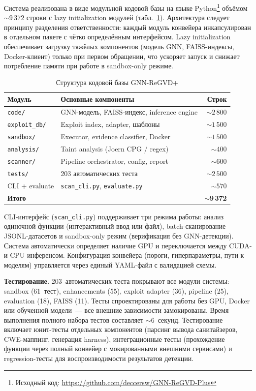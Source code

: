 \documentclass[runningheads]{llncs}
\begin{document}
Система реализована в виде модульной кодовой базы на языке Python\footnote{Исходный код: \url{https://github.com/deccersw/GNN-ReGVD-Plus}} объёмом ${\sim}9\,372$ строки с lazy initialization модулей (табл.~\ref{tab:codebase}). Архитектура следует принципу разделения ответственности: каждый модуль конвейера инкапсулирован в отдельном пакете с чётко определённым интерфейсом. Lazy initialization обеспечивает загрузку тяжёлых компонентов (модель GNN, FAISS-индексы, Docker-клиент) только при первом обращении, что ускоряет запуск и снижает потребление памяти при работе в sandbox-only режиме.

\begin{table}
\centering
\caption{Структура кодовой базы GNN-ReGVD+}
\label{tab:codebase}
\small
\begin{tabular}{|l|l|r|}
\hline
\textbf{Модуль} & \textbf{Основные компоненты} & \textbf{Строк} \\
\hline
\texttt{code/} & GNN-модель, FAISS-индекс, inference engine & ${\sim}2\,800$ \\
\texttt{exploit\_db/} & Exploit index, adapter, шаблоны & ${\sim}1\,500$ \\
\texttt{sandbox/} & Executor, evidence classifier, Docker & ${\sim}1\,500$ \\
\texttt{analysis/} & Taint analysis (Joern CPG / regex) & ${\sim}400$ \\
\texttt{scanner/} & Pipeline orchestrator, config, report & ${\sim}600$ \\
\texttt{tests/} & 203 автоматических теста & ${\sim}2\,500$ \\
CLI + evaluate & \texttt{scan\_cli.py}, \texttt{evaluate.py} & ${\sim}570$ \\
\hline
\textbf{Итого} & & ${\sim}$\textbf{9\,372} \\
\hline
\end{tabular}
\end{table}

CLI-интерфейс (\texttt{scan\_cli.py}) поддерживает три режима работы: анализ одиночной функции (интерактивный ввод или файл), batch-сканирование JSONL-датасетов и sandbox-only режим (верификация без GNN-детекции). Система автоматически определяет наличие GPU и переключается между CUDA- и CPU-инференсом. Конфигурация конвейера (пороги, гиперпараметры, пути к моделям) управляется через единый YAML-файл с валидацией схемы.

\textbf{Тестирование.} 203~автоматических теста покрывают все модули системы: sandbox (61~тест), enhancements (55), exploit adapter (36), pipeline (25), evaluation (18), FAISS (11). Тесты спроектированы для работы без GPU, Docker или обученной модели~--- все внешние зависимости замокированы. Время выполнения полного набора тестов составляет ${\sim}6$~секунд. Тестирование включает юнит-тесты отдельных компонентов (парсинг вывода санитайзеров, CWE-маппинг, генерация harness), интеграционные тесты (прохождение функции через полный конвейер с мокированными внешними сервисами) и regression-тесты для воспроизводимости результатов детекции.
\end{document}
